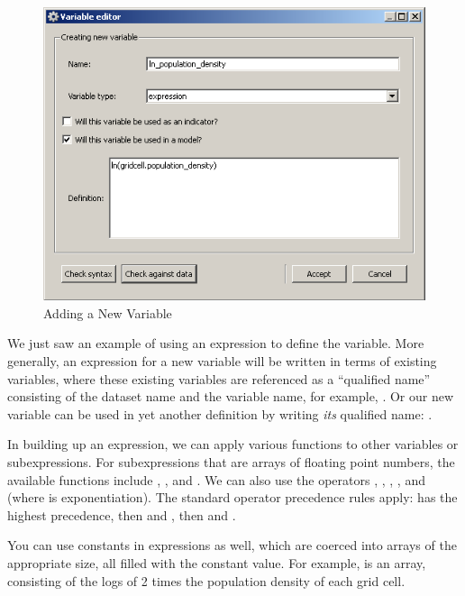 \begin{figure}[htp]
\begin{center}
\includegraphics[scale=0.6]{part-gui/images/model-manager-variable-library-new-variable.png}
\end{center}
\caption{Adding a New Variable}
\label{fig:variable-library-new-variable}
\end{figure}

We just saw an example of using an expression to define the
 variable.  More generally, an expression
for a new variable will be written in terms of existing variables, where
these existing variables are referenced as a ``qualified name'' consisting
of the dataset name and the variable name, for example,
.  Or our new variable can be used in
yet another definition by writing \emph{its} qualified name:
.

In building up an expression, we can apply various functions to other
variables or subexpressions.  For subexpressions that are arrays of
floating point numbers, the available functions include ,
, and .  We can also use the operators \code{+},
\code{-}, \code{*}, \code{/}, and \code{**} (where \code{**} is
exponentiation).  The standard operator precedence rules apply: \code{**}
has the highest precedence, then \code{*} and \code{/}, then \code{+} and
\code{-}.

You can use constants in expressions as well, which are coerced into arrays
of the appropriate size, all filled with the constant value.  For example,
 is an array, consisting of the
logs of 2 times the population density of each grid cell. 

